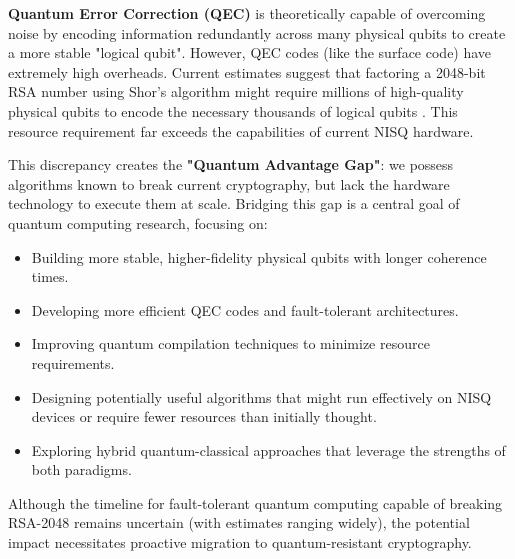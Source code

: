 \textbf{Quantum Error Correction (QEC)} is theoretically capable of overcoming noise by encoding information redundantly across many physical qubits to create a more stable "logical qubit". However, QEC codes (like the surface code) have extremely high overheads. Current estimates suggest that factoring a 2048-bit RSA number using Shor's algorithm might require millions of high-quality physical qubits to encode the necessary thousands of logical qubits \parencite{gidney2021factor}. This resource requirement far exceeds the capabilities of current NISQ hardware.

This discrepancy creates the \textbf{"Quantum Advantage Gap"}: we possess algorithms known to break current cryptography, but lack the hardware technology to execute them at scale. Bridging this gap is a central goal of quantum computing research, focusing on:
\begin{itemize}
    \item Building more stable, higher-fidelity physical qubits with longer coherence times.
    \item Developing more efficient QEC codes and fault-tolerant architectures.
    \item Improving quantum compilation techniques to minimize resource requirements.
    \item Designing potentially useful algorithms that might run effectively on NISQ devices or require fewer resources than initially thought.
    \item Exploring hybrid quantum-classical approaches that leverage the strengths of both paradigms.
\end{itemize}
Although the timeline for fault-tolerant quantum computing capable of breaking RSA-2048 remains uncertain (with estimates ranging widely), the potential impact necessitates proactive migration to quantum-resistant cryptography.